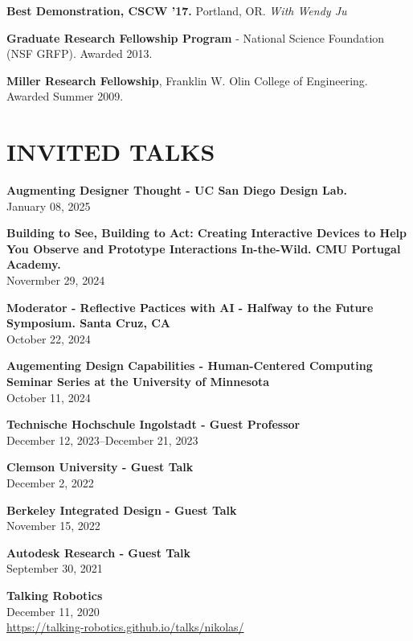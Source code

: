 \documentclass[11pt]{article} %
\begin{document}
\textbf{Best Demonstration, CSCW ’17.} Portland, OR. \textit{With Wendy Ju}
\medskip

\textbf{Graduate Research Fellowship Program} - National Science Foundation (NSF GRFP). Awarded 2013.
\medskip

\textbf{Miller Research Fellowship}, Franklin W. Olin College of Engineering. Awarded Summer 2009.


\section*{INVITED TALKS}
\years

\textbf{Augmenting Designer Thought - UC San Diego Design Lab.}\\
January 08, 2025

\textbf{Building to See, Building to Act: Creating Interactive Devices to Help You Observe and Prototype Interactions In-the-Wild. CMU Portugal Academy.}\\
Novermber 29, 2024

\textbf{Moderator - Reflective Pactices with AI - Halfway to the Future Symposium. Santa Cruz, CA}\\
October 22, 2024

\textbf{Augementing Design Capabilities - Human-Centered Computing Seminar Series at the University of Minnesota}\\
October 11, 2024

\textbf{Technische Hochschule Ingolstadt - Guest Professor}\\
December 12, 2023--December 21, 2023

\textbf{Clemson University - Guest Talk}\\
December 2, 2022

\textbf{Berkeley Integrated Design - Guest Talk}\\
November 15, 2022

\textbf{Autodesk Research - Guest Talk}\\
September 30, 2021
\medskip

 \textbf{Talking Robotics}\\
December 11, 2020\\
\url{https://talking-robotics.github.io/talks/nikolas/}
\end{document}
